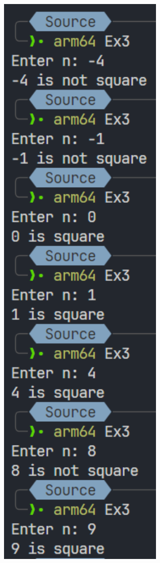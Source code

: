 \documentclass[a4paper,12pt]{report}
\begin{document}
\begin{figure}[!ht]
	\centering
	\begin{subfigure}{0.35\textwidth}
		\centering
		\includegraphics[width=1\textwidth]{imgs/3.png}

\end{subfigure}
\end{figure}
\end{document}
